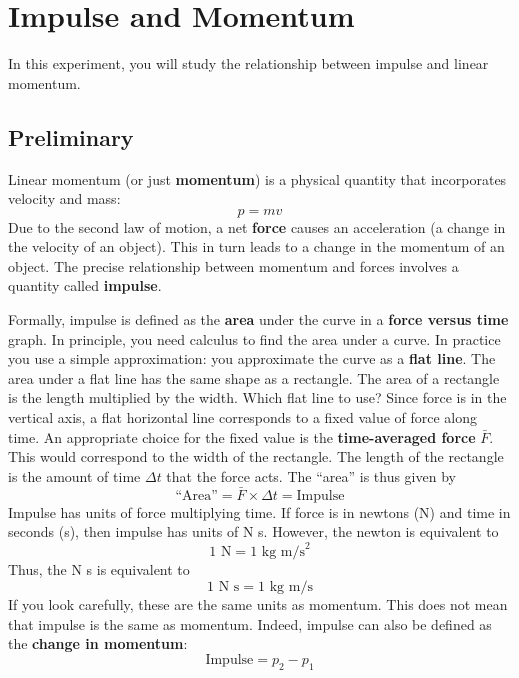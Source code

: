 \setcounter{chapter}{7}
\chapter{Impulse and Momentum}
In this experiment, you will study the relationship between impulse and linear momentum.
\section{Preliminary}
Linear momentum (or just \textbf{momentum}) is a physical quantity that incorporates velocity and mass:
\begin{equation}
    p = m v
\end{equation}
Due to the second law of motion, a net \textbf{force} causes an acceleration (a change in the velocity of an object). This in turn leads to a change in the momentum of an object. The precise relationship between momentum and forces involves a quantity called \textbf{impulse}.

Formally, impulse is defined as the \textbf{area} under the curve in a \textbf{force versus time} graph. In principle, you need calculus to find the area under a curve. In practice you use a simple approximation: you approximate the curve as a \textbf{flat line}. The area under a flat line has the same shape as a rectangle. The area of a rectangle is the length multiplied by the width. Which flat line to use? Since force is in the vertical axis, a flat horizontal line corresponds to a fixed value of force along time. An appropriate choice for the fixed value is the \textbf{time-averaged force} $\bar{F}$. This would correspond to the width of the rectangle. The length of the rectangle is the amount of time $\Delta t$ that the force acts. The ``area'' is thus given by
\begin{equation}
    \text{``Area''} = \bar{F} \times \Delta t = \text{Impulse}
\end{equation}
Impulse has units of force multiplying time. If force is in newtons (N) and time in seconds (s), then impulse has units of N s. However, the newton is equivalent to
\begin{equation}
    1 \text{ N} = 1 \text{ kg m/s}^{2}
\end{equation}
Thus, the N s is equivalent to
\begin{equation}
    1 \text{ N s} = 1 \text{ kg m/s}
\end{equation}
If you look carefully, these are the same units as momentum. This does not mean that impulse is the same as momentum. Indeed, impulse can also be defined as the \textbf{change in momentum}:
\begin{equation}
    \text{Impulse} = p_{2} - p_{1}
\end{equation}
